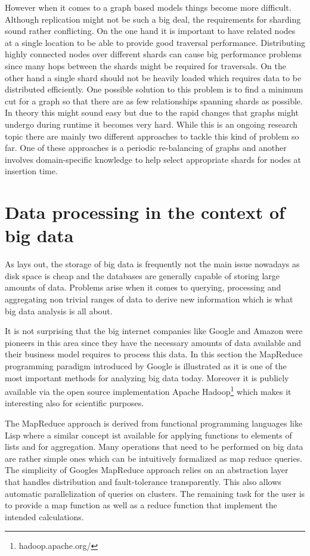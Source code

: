 \documentclass{sig-alternate}
\begin{document}
However when it comes to a graph based models things become more difficult. Although replication might not be such a big deal, the requirements for sharding sound rather conflicting. On the one hand it is important to have related nodes at a single location to be able to provide good traversal performance. Distributing highly connected nodes over different shards can cause big performance problems since many hops between the shards might be required for traversals. On the other hand a single shard should not be heavily loaded which requires data to be distributed efficiently.  One possible solution to this problem is to find a minimum cut for a graph so that there are as few relationships spanning shards as possible. In theory this might sound easy but due to the rapid changes that graphs might undergo during runtime it becomes
very hard. While this is an ongoing research topic there are mainly two different approaches to tackle this kind of problem so far. One of these approaches is a periodic re-balancing of graphs and another involves domain-specific knowledge to help select appropriate shards for nodes at insertion time\cite{webber:sharding}.


\section{Data processing in the context of big data}

As \cite{jacobs:bigdata} lays out, the storage of big data is frequently not the main issue nowadays as disk space is cheap and the databases are generally capable of storing large amounts of data. Problems arise when it comes to querying, processing and aggregating non trivial ranges of data to derive new information which is what big data analysis is all about.

It is not surprising that the big internet companies like Google and Amazon were pioneers in this area since they have the necessary amounts of data available and their business model requires to process this data. In this section the MapReduce programming paradigm introduced by Google is illustrated as it is one of the most important methods for analyzing big data today. Moreover it is publicly available via the open source implementation Apache Hadoop\footnote{hadoop.apache.org/} which makes it interesting also for scientific purposes.


The MapReduce approach is derived from functional programming languages like Lisp where a similar concept ist available for applying functions to elements of lists and for aggregation. Many operations that need to be performed on big data are rather simple ones which can be intuitively formalized as map reduce queries. The simplicity of Googles MapReduce approach relies on an abstraction layer that handles distribution and fault-tolerance transparently. This also allows automatic parallelization of queries on clusters. The remaining task for the user is to provide a map function as well as a reduce function that implement the intended calculations\cite{dean2008mapreduce}.
\end{document}
